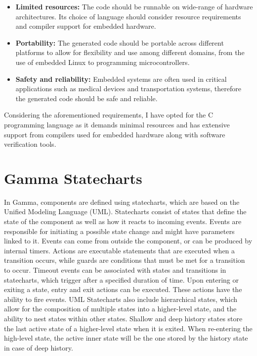 \begin{itemize}
	\item \textbf{Limited resources:} The code should be runnable on wide-range of hardware architectures. Its choice of language should consider resource requirements and compiler support for embedded hardware.
	
	\item \textbf{Portability:} The generated code should be portable across different platforms to allow for flexibility and use among different domains, from the use of embedded Linux to programming microcontrollers.
	
	\item \textbf{Safety and reliability:} Embedded systems are often used in critical applications such as medical devices and transportation systems, therefore the generated code should be safe and reliable.
\end{itemize}

Considering the aforementioned requirements, I have opted for the C programming language as it demands minimal resources and has extensive support from compilers used for embedded hardware along with software verification tools.

\section{Gamma Statecharts}

In Gamma, components are defined using statecharts, which are based on the Unified Modeling Language (UML). Statecharts consist of states that define the state of the component as well as how it reacts to incoming events. Events are responsible for initiating a possible state change and might have parameters linked to it. Events can come from outside the component, or can be produced by internal timers. Actions are executable statements that are executed when a transition occurs, while guards are conditions that must be met for a transition to occur. Timeout events can be associated with states and transitions in statecharts, which trigger after a specified duration of time. Upon entering or exiting a state, entry and exit actions can be executed. These actions have the ability to fire events. UML Statecharts also include hierarchical states, which allow for the composition of multiple states into a higher-level state, and the ability to nest states within other states. Shallow and deep history states store the last active state of a higher-level state when it is exited. When re-entering the high-level state, the active inner state will be the one stored by the history state in case of deep history.

